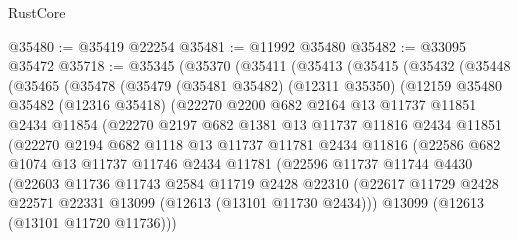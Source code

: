 \begin{lexlean}{RustCore}
\begin{coremodule}
@35480 := @35419 @22254
@35481 := @11992 @35480
@35482 := @33095 @35472
@35718 := @35345
    (@35370
      (@35411
        (@35413
          (@35415
            (@35432
              (@35448
                (@35465
                  (@35478
                    (@35479
                      (@35481 @35482)
                      (@12311 @35350)
                      (@12159
                        @35480
                        @35482
                        (@12316 @35418)
                        (@22270
                          @2200
                          @682
                          @2164
                          @13
                          @11737
                          @11851
                          @2434
                          @11854
                          (@22270
                            @2197
                            @682
                            @1381
                            @13
                            @11737
                            @11816
                            @2434
                            @11851
                            (@22270
                              @2194
                              @682
                              @1118
                              @13
                              @11737
                              @11781
                              @2434
                              @11816
                              (@22586
                                @682
                                @1074
                                @13
                                @11737
                                @11746
                                @2434
                                @11781
                                (@22596
                                  @11737
                                  @11744
                                  @4430
                                  (@22603
                                    @11736
                                    @11743
                                    @2584
                                    @11719
                                    @2428
                                    @22310
                                    (@22617
                                      @11729
                                      @2428
                                      @22571
                                      @22331
                                      @13099
                                      (@12613 (@13101 @11730 @2434)))
                                    @13099
                                    (@12613 (@13101 @11720 @11736)))

\end{coremodule}
\end{lexlean}
